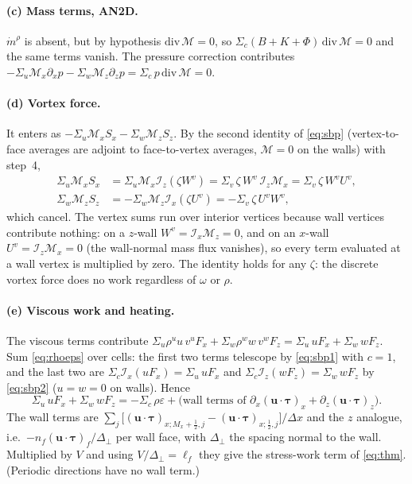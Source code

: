 \documentclass[11pt,a4paper]{article}
\newcommand{\bu}{\mathbf{u}}
\newcommand{\btau}{\boldsymbol{\tau}}
\newcommand{\Ix}{\mathcal{I}_x}
\newcommand{\Iz}{\mathcal{I}_z}
\begin{document}
\paragraph{(c) Mass terms, AN2D.} $\dot m^\rho$ is absent, but by hypothesis $\mathrm{div}\,\mathcal M=0$, so $\Sigma_c(B+K+\Phi)\,\mathrm{div}\,\mathcal M=0$ and the same terms vanish. The pressure correction contributes
$-\Sigma_u\mathcal M_x\partial_xp-\Sigma_w\mathcal M_z\partial_zp=\Sigma_c\,p\,\mathrm{div}\,\mathcal M=0$.

\paragraph{(d) Vortex force.} It enters as $-\Sigma_u\mathcal M_xS_x-\Sigma_w\mathcal M_zS_z$. By the second identity of \eqref{eq:sbp} (vertex-to-face averages are adjoint to face-to-vertex averages, $\mathcal M=0$ on the walls) with step~4,
\begin{equation}\begin{split}
  \Sigma_u\mathcal M_xS_x&=\Sigma_u\mathcal M_x\Iz(\zeta W^v)=\Sigma_v\,\zeta\,W^v\,\Iz\mathcal M_x=\Sigma_v\,\zeta\,W^vU^v,\\
  \Sigma_w\mathcal M_zS_z&=-\Sigma_w\mathcal M_z\Ix(\zeta U^v)=-\Sigma_v\,\zeta\,U^vW^v,
\end{split}\end{equation}
which cancel. The vertex sums run over interior vertices because wall vertices contribute nothing: on a $z$-wall $W^v=\Ix\mathcal M_z=0$, and on an $x$-wall $U^v=\Iz\mathcal M_x=0$ (the wall-normal mass flux vanishes), so every term evaluated at a wall vertex is multiplied by zero.
The identity holds for any $\zeta$: the discrete vortex force does no work regardless of $\omega$ or $\rho$.

\paragraph{(e) Viscous work and heating.} The viscous terms contribute $\Sigma_u\rho^uu\,v^uF_x+\Sigma_w\rho^ww\,v^wF_z=\Sigma_u\,uF_x+\Sigma_w\,wF_z$. Sum \eqref{eq:rhoeps} over cells: the first two terms telescope by \eqref{eq:sbp1} with $c=1$, and
the last two are $\Sigma_c\Ix(uF_x)=\Sigma_u\,uF_x$ and $\Sigma_c\Iz(wF_z)=\Sigma_w\,wF_z$ by \eqref{eq:sbp2} ($u=w=0$ on walls). Hence
\begin{equation}
  \Sigma_u\,uF_x+\Sigma_w\,wF_z=-\Sigma_c\,\rho\varepsilon+\text{(wall terms of }\partial_x(\bu\!\cdot\!\btau)_x+\partial_z(\bu\!\cdot\!\btau)_z).
\end{equation}
The wall terms are $\sum_j\big[(\bu\!\cdot\!\btau)_{x;M_x+\frac12,j}-(\bu\!\cdot\!\btau)_{x;\frac12,j}\big]/\Delta x$ and the $z$ analogue, i.e.\ $-n_f(\bu\!\cdot\!\btau)_f/\Delta_\perp$ per wall face, with $\Delta_\perp$ the spacing normal to the wall. Multiplied by $V$ and using $V/\Delta_\perp=\ell_f$ they give the stress-work term of \eqref{eq:thm}. (Periodic directions have no wall term.)
\end{document}
